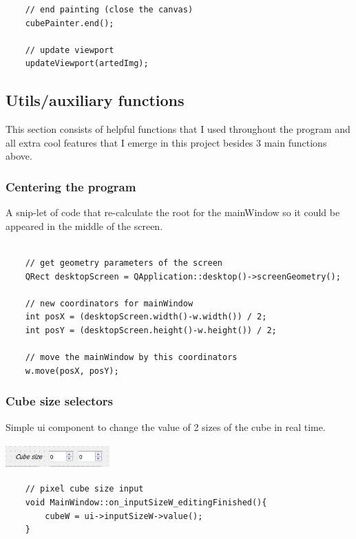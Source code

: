 \documentclass[english]{article}
\begin{document}
{\begin{lstlisting}
	// end painting (close the canvas)
	cubePainter.end();

	// update viewport 
	updateViewport(artedImg);

\end{lstlisting}

\newpage

\subsection{Utils/auxiliary functions}

This section consists of helpful functions that I used throughout the program and all extra cool features that I emerge in this project besides 3 main functions above. 

\subsubsection{Centering the program}

A snip-let of code that re-calculate the root for the mainWindow so it could be appeared in the middle of the screen.

\lstset{language=C++}
\begin{lstlisting}

	// get geometry parameters of the screen
	QRect desktopScreen = QApplication::desktop()->screenGeometry();
	
	// new coordinators for mainWindow
	int posX = (desktopScreen.width()-w.width()) / 2;
	int posY = (desktopScreen.height()-w.height()) / 2;
	
	// move the mainWindow by this coordinators
	w.move(posX, posY);
\end{lstlisting}


\subsubsection{Cube size selectors}

Simple ui component to change the value of 2 sizes of the cube in real time.

\begin{center}
	\includegraphics[width=4cm,height=1cm]{img/cubesize.jpg}	
\end{center} 

\lstset{language=C++}
\begin{lstlisting}
	// pixel cube size input
	void MainWindow::on_inputSizeW_editingFinished(){
		cubeW = ui->inputSizeW->value();
	}
	

\end{lstlisting}}
\end{document}
